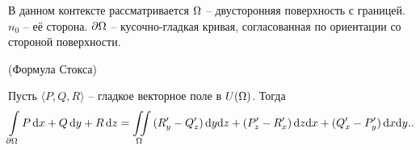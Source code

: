 \begin{remark}
    В данном контексте рассматривается $\Omega$ -- двусторонняя поверхность с границей.
    $n_0$ -- её сторона. $\partial \Omega$ -- кусочно-гладкая кривая, согласованная
    по ориентации со стороной поверхности.
\end{remark}

\begin{theorem}(Формула Стокса)

    Пусть $\langle P, Q, R \rangle$ -- гладкое векторное поле в $U(\Omega)$. Тогда
    \begin{align*}
        \int\limits_{\partial \Omega}{P \,\mathrm{d} x + Q \,\mathrm{d} y + R \,\mathrm{d} z} =
        \iint\limits_{\Omega}{(R'_y - Q'_z) \,\mathrm{d} y \mathrm{d} z + (P'_z - R'_x) \,\mathrm{d} z \mathrm{d} x + (Q'_x - P'_y) \,\mathrm{d} x \mathrm{d} y}
    ..\end{align*}
\end{theorem}
